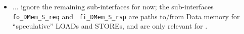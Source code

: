 \begin{frame}[fragile]
\begin{center}
\begin{minipage}{0.8\textwidth}
\begin{itemize}
    \vspace*{5ex}

    \item ... ignore the remaining sub-interfaces for now; {\eg} the
       sub-interfaces {\tt fo\_DMem\_S\_req} and {\tt
       fi\_DMem\_S\_rsp} are paths to/from Data memory for
       ``speculative'' LOADs and STOREs, and are only relevant for
       {\FIFE}.

  \end{itemize}
 \end{minipage}

\end{center}

\end{frame}


